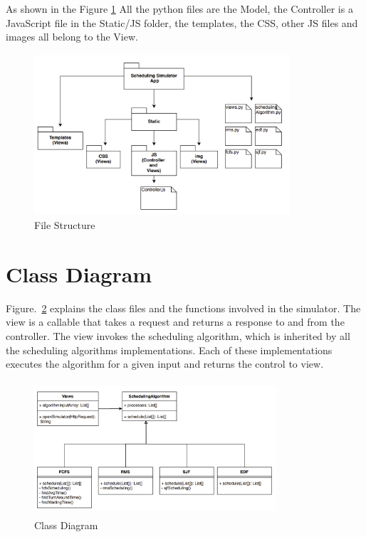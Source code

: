 \documentclass[12pt, conference]{IEEEtran}
\begin{document}
As shown in the Figure \ref{folderStructure} All the python files are the Model, the Controller is a JavaScript file in the Static/JS folder, the templates, the CSS, other JS files and images all belong to the View.
\begin{figure}
\centerline{\includegraphics[width=9.5cm, height=6cm]{FolderStructure.png}}
    \caption{File Structure}
\label{folderStructure}
\end{figure}

\section{Class Diagram}
Figure.~\ref{classDiagram} explains the class files and the functions involved in the simulator. The view is a callable that takes a request and returns a response to and from the controller. The view invokes the scheduling algorithm, which is inherited by all the scheduling algorithms implementations. Each of these implementations executes the algorithm for a given input and returns the control to view.

\begin{figure}
\centerline{\includegraphics[width=9cm, height=5cm]{ClassDiagram.png}}
\caption{Class Diagram}
\label{classDiagram}
\end{figure} 
\end{document}
